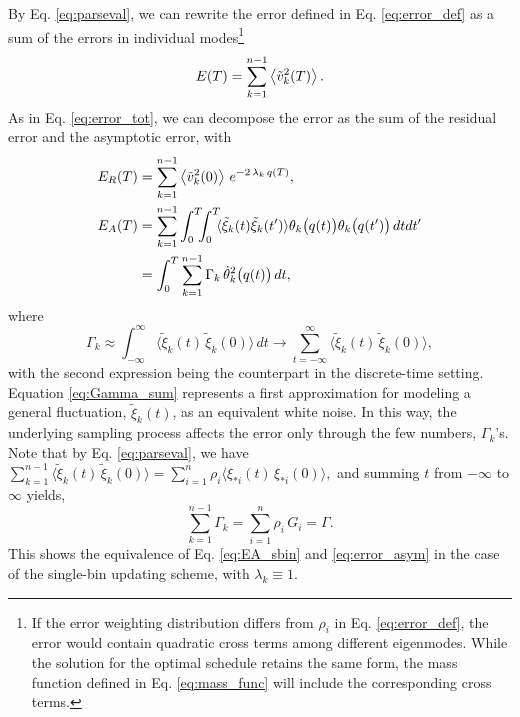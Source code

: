\documentclass[reprint, superscriptaddress, floatfix]{revtex4-1}
\newcommand{\Err}{E}
\begin{document}
By Eq. \eqref{eq:parseval},
we can rewrite the error defined in Eq. \eqref{eq:error_def} as
a sum of the errors in individual modes\footnote{If
the error weighting distribution differs from $\rho_i$
in Eq. \eqref{eq:error_def},
the error would contain quadratic cross terms among different eigenmodes.
%
While the solution for the optimal schedule retains the same form,
the mass function defined in Eq. \eqref{eq:mass_func}
will include the corresponding cross terms.
}
%
\begin{align}
  \Err(T)
  =
  \sum_{k = 1}^{n - 1}
    \left\langle
      {\tilde v}_k^2(T)
    \right\rangle
  .
  \notag
\end{align}
%
As in Eq. \eqref{eq:error_tot},
we can decompose the error as the sum
of the residual error and the asymptotic error, with
\begin{align}
  \Err_R(T)
  &=
  \sum_{k = 1}^{n-1}
    \left\langle
      {\tilde v}_k^2(0)
    \right\rangle \,
    e^{ - 2 \, \lambda_k  \, q(T) }
  ,
  \label{eq:error_res}
  \\
  \Err_A(T)
  &=
  \sum_{k=1}^{n-1}
  \int_0^T\!\!\!\int_0^T
  \!\!
  \langle
    \tilde\xi_k(t)
    \tilde\xi_k(t')
  \rangle
  \theta_k\bigl(q(t)\bigr)
  \theta_k\bigl(q(t')\bigr)
  \, dtdt'
  \notag \\
  &=
  \int_0^T
  \sum_{k = 1}^{n-1}
  \Gamma_k \, \dot \theta_k^2\bigl( q(t) \bigr) \, dt
  ,
  \label{eq:error_asym}
\end{align}
%
where
%
%
\begin{equation}
  \Gamma_k
  \approx
  \int_{-\infty}^\infty
  \bigl\langle
    \tilde\xi_k(t) \, \tilde\xi_k(0)
  \bigr\rangle
  \, dt
  \to
  \sum_{t = -\infty}^\infty
  \bigl\langle
    \tilde\xi_k(t) \, \tilde\xi_k(0)
  \bigr\rangle
  ,
  \label{eq:Gamma_sum}
\end{equation}
%
with the second expression being
the counterpart in the discrete-time setting.
%
Equation \eqref{eq:Gamma_sum} represents
a first approximation for modeling
a general fluctuation, ${\tilde \xi}_k(t)$,
as an equivalent white noise.
In this way,
the underlying sampling process
affects the error only through the
few numbers, $\Gamma_k$'s.
%
Note that by Eq. \eqref{eq:parseval}, we have
$\sum_{k=1}^{n-1} \bigl\langle {\tilde \xi}_k(t) \, {\tilde \xi}_k(0) \bigr\rangle
= \sum_{i=1}^n \rho_i \bigl\langle \xi_{*i}(t) \, \xi_{*i}(0) \bigr\rangle,$
and summing $t$ from $-\infty$ to $\infty$ yields,
\begin{equation}
  \sum_{k=1}^{n-1} \Gamma_k = \sum_{i=1}^n \rho_i \, G_i = \Gamma
  .
  \label{eq:Gammak_sum}
\end{equation}
This shows the equivalence of
Eq. \eqref{eq:EA_sbin} and \eqref{eq:error_asym}
in the case of the single-bin updating scheme, with $\lambda_k \equiv 1$.
%
\end{document}
